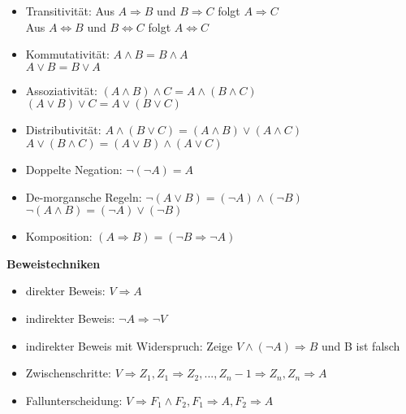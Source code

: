\documentclass{article}
\begin{document}
	\begin{itemize}
	\item Transitivität: \tabto{3.2cm} Aus $A \Rightarrow B$ und $B \Rightarrow C$ folgt $A \Rightarrow C$\\
	\tabto{3.2cm} Aus $A \Leftrightarrow B$ und $B \Leftrightarrow C$ folgt $A \Leftrightarrow C$
	\item Kommutativität: \tabto{3.2cm} $A \land B = B \land A$\\
	\tabto{3.2cm} $A \lor B = B \lor A$
	\item Assoziativität: \tabto{3.2cm} $(A \land B) \land C = A \land (B \land C)$\\
	\tabto{3.2cm} $(A \lor B) \lor C = A \lor (B \lor C)$
	\item Distributivität: \tabto{3.2cm} $A \land (B \lor C) = (A \land B) \lor (A \land C)$\\
	\tabto{3.2cm} $A \lor (B \land C) = (A \lor B) \land (A \lor C)$
	\item Doppelte Negation: \tabto{3.2cm} $\lnot ( \lnot A) = A$
	\item De-morgansche Regeln: \tabto{3.2cm} $\lnot (A \lor B) = (\lnot A) \land (\lnot B)$\\
	\tabto{3.2cm} $\lnot (A \land B) = (\lnot A) \lor (\lnot B)$
	\item Komposition: $(A \Rightarrow B) = (\lnot B \Rightarrow \lnot A)$
	\end{itemize}
	\begin{tcolorbox}[width=\linewidth, sharp corners=all, colback=white!95!black]
	\textbf{Beweistechniken}
	\begin{itemize}
	\item direkter Beweis: $V \Rightarrow A$
	\item indirekter Beweis: $\lnot A \Rightarrow \lnot V$
	\item indirekter Beweis mit Widerspruch: Zeige $V \land (\lnot A) \Rightarrow B$ und B ist falsch
	\item Zwischenschritte: $V \Rightarrow Z_1, Z_1 \Rightarrow Z_2, ... , Z_n-1 \Rightarrow Z_n, Z_n \Rightarrow A$
	\item Fallunterscheidung: $V \Rightarrow F_1 \land F_2, F_1 \Rightarrow A, F_2 \Rightarrow A$
	\end{itemize}
	\end{tcolorbox}
	
\end{document}
